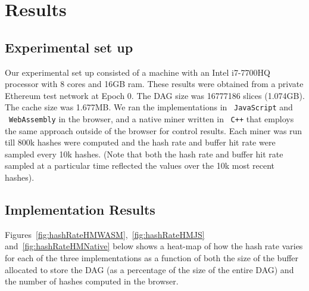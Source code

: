 \documentclass[runningheads]{llncs}
\begin{document}


\section{Results}
\label{sec:results}
\subsection{Experimental set up}
Our experimental set up consisted of a machine with an Intel i7-7700HQ processor with 8 cores and 16GB ram. These results were obtained from a private Ethereum test network at Epoch 0. The DAG size was 16777186 slices (1.074GB). The cache size was 1.677MB. We ran the implementations in ~\verb|JavaScript| and ~\verb|WebAssembly| in the browser, and a native miner written in ~\verb|C++| that employs the same approach outside of the browser for control results. Each miner was run till 800k hashes were computed and the hash rate and buffer hit rate were sampled every 10k hashes. (Note that both the hash rate and buffer hit rate sampled at a particular time reflected the values over the 10k most recent hashes).

\subsection{Implementation Results}
\label{sec:results}
Figures~\ref{fig:hashRateHMWASM},~\ref{fig:hashRateHMJS} and~\ref{fig:hashRateHMNative} below shows a heat-map of how the hash rate varies for each of the three implementations as a function of both the size of the buffer allocated to store the DAG (as a percentage of the size of the entire DAG) and the number of hashes computed in the browser. 
\end{document}
